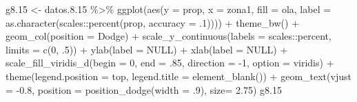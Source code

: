 \documentclass[
  12pt,
]{book}
\newenvironment{Shaded}{\begin{snugshade}}{\end{snugshade}}
\newcommand{\AttributeTok}[1]{\textcolor[rgb]{0.77,0.63,0.00}{#1}}
\newcommand{\ConstantTok}[1]{\textcolor[rgb]{0.00,0.00,0.00}{#1}}
\newcommand{\DecValTok}[1]{\textcolor[rgb]{0.00,0.00,0.81}{#1}}
\newcommand{\FloatTok}[1]{\textcolor[rgb]{0.00,0.00,0.81}{#1}}
\newcommand{\FunctionTok}[1]{\textcolor[rgb]{0.00,0.00,0.00}{#1}}
\newcommand{\NormalTok}[1]{#1}
\newcommand{\OtherTok}[1]{\textcolor[rgb]{0.56,0.35,0.01}{#1}}
\newcommand{\SpecialCharTok}[1]{\textcolor[rgb]{0.00,0.00,0.00}{#1}}
\newcommand{\StringTok}[1]{\textcolor[rgb]{0.31,0.60,0.02}{#1}}
\begin{document}
\begin{Shaded}
\begin{Highlighting}[]
\NormalTok{g8}\FloatTok{.15} \OtherTok{\textless{}{-}}\NormalTok{ datos.}\FloatTok{8.15} \SpecialCharTok{\%\textgreater{}\%} 
  \FunctionTok{ggplot}\NormalTok{(}\FunctionTok{aes}\NormalTok{(}\AttributeTok{y =}\NormalTok{ prop, }\AttributeTok{x =}\NormalTok{ zona1, }\AttributeTok{fill =}\NormalTok{ ola, }
             \AttributeTok{label =} \FunctionTok{as.character}\NormalTok{(scales}\SpecialCharTok{::}\FunctionTok{percent}\NormalTok{(prop, }\AttributeTok{accuracy =}\NormalTok{ .}\DecValTok{1}\NormalTok{)))) }\SpecialCharTok{+} 
  \FunctionTok{theme\_bw}\NormalTok{() }\SpecialCharTok{+} 
  \FunctionTok{geom\_col}\NormalTok{(}\AttributeTok{position =} \StringTok{\textquotesingle{}Dodge\textquotesingle{}}\NormalTok{) }\SpecialCharTok{+}
  \FunctionTok{scale\_y\_continuous}\NormalTok{(}\AttributeTok{labels =}\NormalTok{ scales}\SpecialCharTok{::}\NormalTok{percent,}
                     \AttributeTok{limits =} \FunctionTok{c}\NormalTok{(}\DecValTok{0}\NormalTok{, .}\DecValTok{5}\NormalTok{)) }\SpecialCharTok{+}
  \FunctionTok{ylab}\NormalTok{(}\AttributeTok{label =} \ConstantTok{NULL}\NormalTok{) }\SpecialCharTok{+}
  \FunctionTok{xlab}\NormalTok{(}\AttributeTok{label =} \ConstantTok{NULL}\NormalTok{) }\SpecialCharTok{+}
  \FunctionTok{scale\_fill\_viridis\_d}\NormalTok{(}\AttributeTok{begin =} \DecValTok{0}\NormalTok{, }\AttributeTok{end =}\NormalTok{ .}\DecValTok{85}\NormalTok{, }\AttributeTok{direction =} \SpecialCharTok{{-}}\DecValTok{1}\NormalTok{, }\AttributeTok{option =} \StringTok{\textquotesingle{}viridis\textquotesingle{}}\NormalTok{) }\SpecialCharTok{+}
  \FunctionTok{theme}\NormalTok{(}\AttributeTok{legend.position =} \StringTok{\textquotesingle{}top\textquotesingle{}}\NormalTok{,}
        \AttributeTok{legend.title =} \FunctionTok{element\_blank}\NormalTok{()) }\SpecialCharTok{+}
  \FunctionTok{geom\_text}\NormalTok{(}\AttributeTok{vjust =} \SpecialCharTok{{-}}\FloatTok{0.8}\NormalTok{,}
            \AttributeTok{position =} \FunctionTok{position\_dodge}\NormalTok{(}\AttributeTok{width =}\NormalTok{ .}\DecValTok{9}\NormalTok{),}
            \AttributeTok{size=} \FloatTok{2.75}\NormalTok{)}
\NormalTok{g8}\FloatTok{.15}
\end{Highlighting}
\end{Shaded}
\end{document}
